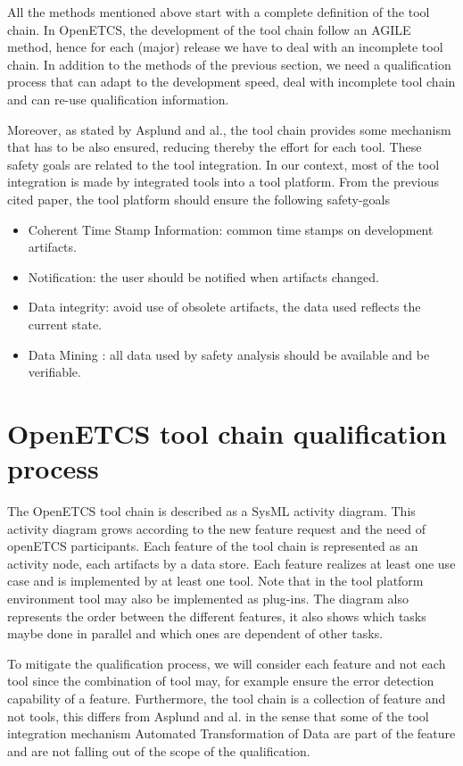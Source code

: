 \documentclass{openetcs_report}
\begin{document}
All the methods mentioned above start with a complete definition of the tool
chain. In OpenETCS, the development of the tool chain follow an AGILE method,
hence for each (major) release we have to deal with an incomplete tool
chain. In addition to the methods of the previous section,  we need a qualification
process that can adapt to the development speed, deal with incomplete tool chain
and can re-use qualification information.

Moreover, as stated by Asplund and al., the tool chain provides some mechanism
that has to be also ensured, reducing thereby the effort for each tool. These
safety goals are related to the tool integration. In our context, most of  the tool
integration is made by integrated tools into a tool platform.
From the previous cited paper, the tool platform should ensure the following
safety-goals
\begin{itemize}
\item Coherent Time Stamp Information: common time stamps on development artifacts.
\item Notification: the user should be notified when artifacts changed.
\item Data integrity:  avoid use of obsolete artifacts, the data used reflects the
  current state.
\item Data Mining : all data used by safety analysis should be available and be
  verifiable.
\end{itemize}

\section{OpenETCS tool chain qualification process}
\label{sec-2-2}

The OpenETCS tool chain is described as a SysML activity diagram. This
activity diagram grows according to the new feature request and the
need of openETCS participants.  Each feature of the tool chain is
represented as an activity node, each artifacts by a data store.  Each
feature realizes at least one use case and is implemented by at least
one tool. Note that in the tool platform environment tool may also be
implemented as plug-ins.  The diagram also represents the order
between the different features, it also shows which tasks maybe done
in parallel and which ones are dependent of other tasks.

To mitigate the qualification process, we will consider each feature and not
each tool since the combination of tool may, for example ensure the error
detection capability of a feature.  Furthermore, the tool chain is a collection
of feature and not tools, this differs from Asplund and al. in the sense that
some of the tool integration mechanism Automated Transformation of Data are part
of the feature and are not falling out of the scope of the qualification.
\end{document}

